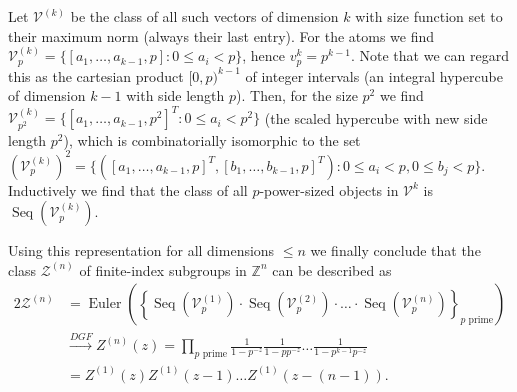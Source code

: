 \begin{exm}[Sublattices]
Let $\mathcal{V}^{(k)}$ be the class of all such vectors of dimension $k$ with size function set to their maximum norm (always their last entry).
For the atoms we find $\mathcal{V}_p^{(k)} = \{ [a_1, \dots, a_{k-1}, p] : 0 \leq a_i < p \}$, hence $v_p^k = p^{k-1}$.
Note that we can regard this as the cartesian product $[0, p)^{k-1}$ of integer intervals (an integral hypercube of dimension $k-1$ with side length $p$).
Then, for the size $p^2$ we find $\mathcal{V}_{p^2}^{(k)} = \{ [a_1, \dots, a_{k-1}, p^2]^T : 0 \leq a_i < p^2 \}$ (the scaled hypercube with new side length $p^2$), which is combinatorially isomorphic to the set $(\mathcal{V}_p^{(k)})^2 = \{ ([a_1, \dots, a_{k-1}, p]^T, [b_1, \dots, b_{k-1}, p]^T) : 0 \leq a_i < p, 0 \leq b_j < p \}$.
Inductively we find that the class of all $p$-power-sized objects in $\mathcal{V}^k$ is $\operatorname{Seq}(\mathcal{V}_p^{(k)})$.

Using this representation for all dimensions $\leq n$ we finally conclude that the class $\mathcal{Z}^{(n)}$ of finite-index subgroups in $\mathbb{Z}^n$ can be described as
\begin{alignat*}{2}
    \mathcal{Z}^{(n)} &= \operatorname{Euler} \left( \left\{ \operatorname{Seq}(\mathcal{V}_p^{(1)}) \cdot \operatorname{Seq}(\mathcal{V}_p^{(2)}) \cdot \ldots \cdot \operatorname{Seq}(\mathcal{V}_p^{(n)}) \right\}_{p \text{ prime}} \right) \\
    &\xrightarrow{DGF} Z^{(n)}(z) = \prod_{p \text{ prime}} \frac{1}{1-p^{-z}} \frac{1}{1-p p^{-z}} \ldots \frac{1}{1-p^{k-1} p^{-z}} \\
    &= Z^{(1)}(z) Z^{(1)}(z - 1) \ldots Z^{(1)}(z - (n-1)).
\end{alignat*}

\end{exm}